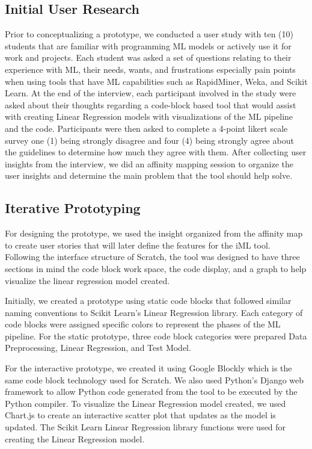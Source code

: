\documentclass{sigchi}
\begin{document}
\subsection{Initial User Research}
Prior to conceptualizing a prototype, we conducted a user study with ten (10) students that are familiar with programming ML models or actively use it for work and projects. Each student was asked a set of questions relating to their experience with ML, their needs, wants, and frustrations especially pain points when using tools that have ML capabilities such as RapidMiner, Weka, and Scikit Learn. At the end of the interview, each participant involved in the study were asked about their thoughts regarding a code-block based tool that would assist with creating Linear Regression models with visualizations of the ML pipeline and the code. Participants were then asked to complete a 4-point likert scale survey \textemdash one (1) being strongly disagree and four (4) being strongly agree \textemdash about the guidelines to determine how much they agree with them. After collecting user insights from the interview, we did an affinity mapping session to organize the user insights and determine the main problem that the tool should help solve.  

\subsection{Iterative Prototyping}
For designing the prototype, we used the insight organized from the affinity map to create user stories that will later define the features for the iML tool. Following the interface structure of Scratch, the tool was designed to have three sections in mind \textemdash the code block work space, the code display, and a graph to help visualize the linear regression model created.

Initially, we created a prototype using static code blocks that followed similar naming conventions to Scikit Learn's Linear Regression library. Each category of code blocks were assigned specific colors to represent the phases of the ML pipeline. For the static prototype, three code block categories were prepared \textemdash Data Preprocessing, Linear Regression, and Test Model. 

For the interactive prototype, we created it using Google Blockly which is the same code block technology used for Scratch. We also used Python's Django web framework to allow Python code generated from the tool to be executed by the Python compiler. To visualize the Linear Regression model created, we used Chart.js to create an interactive scatter plot that updates as the model is updated. The Scikit Learn Linear Regression library functions were used for creating the Linear Regression model. 
\end{document}
